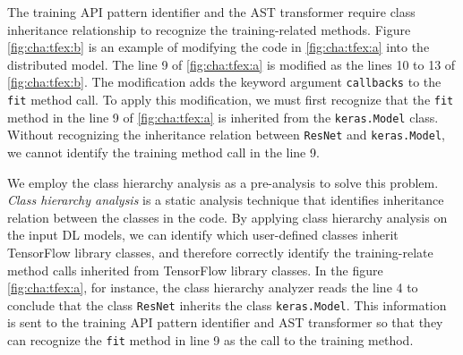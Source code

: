 The training API pattern identifier and the AST transformer require
class inheritance relationship to recognize the training-related methods.
Figure \ref{fig:cha:tfex:b} is an example of modifying the code in 
\ref{fig:cha:tfex:a} into the distributed model.
The line 9 of \ref{fig:cha:tfex:a} is modified as the lines 10 to 13 of 
\ref{fig:cha:tfex:b}. The modification adds the keyword argument 
{\tt callbacks} to the {\tt fit} method call. 
To apply this modification, we must first recognize that the {\tt fit} method
in the line 9 of \ref{fig:cha:tfex:a} is inherited from the
{\tt keras.Model} class.
Without recognizing the inheritance relation between {\tt ResNet} and
{\tt keras.Model}, we cannot identify the training method call 
in the line 9.  

We employ the class hierarchy analysis as a pre-analysis to solve this problem. 
\textit{Class hierarchy analysis} is a static analysis technique that identifies
inheritance relation between the classes in the code.
By applying class hierarchy analysis on the input DL models,
we can identify which user-defined classes inherit TensorFlow library classes,
and therefore correctly identify the training-relate
method calls inherited from TensorFlow library classes.
In the figure \ref{fig:cha:tfex:a}, for instance, 
the class hierarchy analyzer reads the line 4 to conclude that the class
{\tt ResNet} inherits the class {\tt keras.Model}.
This information is sent to the training API pattern identifier and 
AST transformer so that they can recognize the {\tt fit} method in line 9 
as the call to the training method. 
